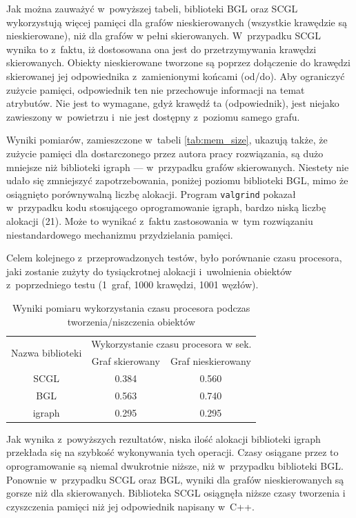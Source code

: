 \documentclass[a4paper,12pt,polish,twoside,openright]{thesis}
\newcommand\code[1]{\lstinline[style=line]{#1}}
\begin{document}
Jak można zauważyć w~powyższej tabeli, biblioteki BGL oraz SCGL wykorzystują więcej pamięci dla grafów nieskierowanych (wszystkie krawędzie są nieskierowane), niż dla grafów w pełni skierowanych.
W~przypadku SCGL wynika to z~faktu, iż dostosowana ona jest do przetrzymywania krawędzi skierowanych.
Obiekty nieskierowane tworzone są poprzez dołączenie do krawędzi skierowanej jej odpowiednika z~zamienionymi końcami (od/do).
Aby ograniczyć zużycie pamięci, odpowiednik ten nie przechowuje informacji na temat atrybutów.
Nie jest to wymagane, gdyż krawędź ta (odpowiednik), jest niejako zawieszony w~powietrzu i~nie jest dostępny z~poziomu samego grafu.

Wyniki pomiarów, zamieszczone w~tabeli \ref{tab:mem_size}, ukazują także, że zużycie pamięci dla dostarczonego przez autora pracy rozwiązania, są dużo mniejsze niż biblioteki igraph --- w~przypadku grafów skierowanych.
Niestety nie udało się zmniejszyć zapotrzebowania, poniżej poziomu biblioteki BGL, mimo że osiągnięto porównywalną liczbę alokacji.
Program \code{valgrind} pokazał w~przypadku kodu stosującego oprogramowanie igraph, bardzo niską liczbę alokacji (21).
Może to wynikać z~faktu zastosowania w~tym rozwiązaniu niestandardowego mechanizmu przydzielania pamięci.

Celem kolejnego z~przeprowadzonych testów, było porównanie czasu procesora, jaki zostanie zużyty do tysiąckrotnej alokacji i~uwolnienia obiektów z~poprzedniego testu (1~graf, 1000 krawędzi, 1001 węzłów).
\begin{table}[htb]
\caption{Wyniki pomiaru wykorzystania czasu procesora podczas tworzenia/niszczenia obiektów}
\label{tab:mem_speed}
\centering
\begin{tabular}{ | c | c | c | }
	\hline
	\multirow{2}{*}{Nazwa biblioteki } & \multicolumn{2}{|c|}{Wykorzystanie czasu procesora w sek.} \\
	\cline{2-3}
		& Graf skierowany & Graf nieskierowany \\
	\hline \hline
	SCGL    & 0.384 & 0.560 \\ \hline
	BGL     & 0.563 & 0.740 \\ \hline
	igraph  & 0.295 & 0.295 \\ \hline
\end{tabular}
\end{table}

Jak wynika z~powyższych rezultatów, niska ilość alokacji biblioteki igraph przekłada się na szybkość wykonywania tych operacji.
Czasy osiągane przez to oprogramowanie są niemal dwukrotnie niższe, niż w~przypadku biblioteki BGL.
Ponownie w~przypadku SCGL oraz BGL, wyniki dla grafów nieskierowanych są gorsze niż dla skierowanych.
Biblioteka SCGL osiągnęła niższe czasy tworzenia i czyszczenia pamięci niż jej odpowiednik napisany w~C++.
\end{document}
